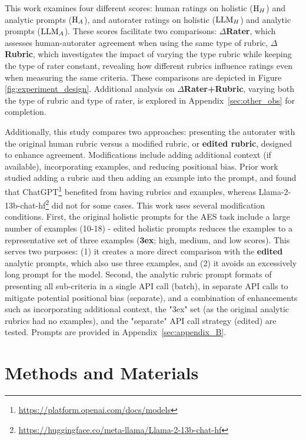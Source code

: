 This work examines four different scores: human ratings on holistic ($\textnormal{H}_{H}$) and analytic prompts ($\textnormal{H}_{A}$), and autorater ratings on holistic ($\textnormal{LLM}_{H}$) and analytic prompts ($\textnormal{LLM}_{A}$). These scores facilitate two comparisons: \textbf{$\Delta$Rater}, which assesses human-autorater agreement when using the same type of rubric, \textbf{$\Delta$Rubric}, which investigates the impact of varying the type rubric while keeping the type of rater constant, revealing how different rubrics influence ratings even when measuring the same criteria. These comparisons are depicted in Figure \ref{fig:experiment_design}. Additional analysis on \textbf{$\Delta$Rater+Rubric}, varying both the type of rubric and type of rater, is explored in Appendix~\ref{sec:other_obs} for completion.

Additionally, this study compares two approaches: presenting the autorater with the original human rubric versus a modified rubric, or \textbf{edited rubric}, designed to enhance agreement. Modifications include adding additional context (if available), incorporating examples, and reducing positional bias. Prior work \citep{mansour-etal-2024-large} studied adding a rubric and then adding an example into the prompt, and found that ChatGPT\footnote{\label{note}\url{https://platform.openai.com/docs/models}} benefited from having rubrics and examples, whereas Llama-2-13b-chat-hf\footnote{\url{https://huggingface.co/meta-llama/Llama-2-13b-chat-hf}} did not for some cases. This work uses several modification conditions. First, the original holistic prompts for the AES task include a large number of examples (10-18) - edited holistic prompts reduces the examples to a representative set of three examples (\textbf{3ex}; high, medium, and low scores). This serves two purposes: (1) it creates a more direct comparison with the \textbf{edited} analytic prompts, which also use three examples, and (2) it avoids an excessively long prompt for the model. Second, the analytic rubric prompt formats of presenting all sub-criteria in a single API call (batch), in separate API calls to mitigate potential positional bias (separate), and a combination of enhancements such as incorporating additional context, the "3ex" set (as the original analytic rubrics had no examples), and the "separate" API call strategy (edited) are tested. Prompts are provided in Appendix~\ref{sec:appendix_B}. 

\section{Methods and Materials}


